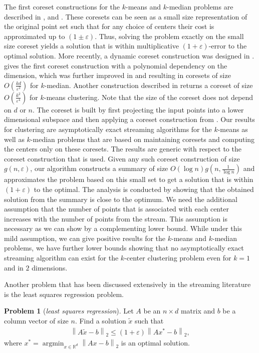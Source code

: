 \documentclass[a4paper,11pt,oneside,english,onecolumn]{article}
\theoremstyle{definition}
\newtheorem{problem}{Problem}
\newcommand{\bigO}[1]{\ensuremath{O\left( #1 \right)}}
\newcommand{\norm}[1]{\ensuremath{\left\| #1\right\|_2}}
\DeclareMathOperator{\argmin}{argmin}
\newcommand{\REAL}{\ensuremath{\mathbb{R}}}
\newcommand{\eps}{\ensuremath{\varepsilon}}
\begin{document}
The first coreset constructions for the $k$-means and $k$-median problems are described in \cite{FirstCoreset}, \cite{HPClustering} and \cite{SmallerCoresets}. These coresets can be seen as a small size representation of the original point set such that for any choice of centers their cost is approximated up to $(1\pm\eps)$. Thus, solving the problem exactly on the small size coreset yields a solution that is within multiplicative $(1+\eps)$-error to the optimal solution. More recently, a dynamic coreset construction was designed in \cite{DynamicCoreset}. \cite{PolyCoreset} gives the first coreset construction with a polynomial dependency on the dimension, which was further improved in \cite{ImproveCoreset1} and \cite{Feldman} resulting in coresets of size $O(\frac{kd}{\eps^2})$ for $k$-median. Another construction described in \cite{TinyData} returns a coreset of size $O(\frac{k ^2}{\eps^4})$ for $k$-means clustering. Note that the size of the coreset does not depend on $d$ or $n$. The coreset is built by first projecting the input points into a lower dimensional subspace and then applying a coreset construction from \cite{Feldman}.
Our results for clustering are asymptotically exact streaming algorithms for the $k$-means as well as $k$-median problems that are based on maintaining coresets and computing the centers only on these coresets. The results are generic with respect to the coreset construction that is used. Given any such coreset construction of size $g(n, \eps )$, our algorithm constructs a summary of size $\bigO{\log n} g(n, \frac 1 {\log n} )$ and approximates the problem based on this small set to get a solution that is within $(1+\eps)$ to the optimal. 
The analysis is conducted by showing that the obtained solution from the summary is close to the optimum. We need the additional assumption that the number of points that is associated with each center increases with the number of points from the stream. This assumption is necessary as we can show by a complementing lower bound. While under this mild assumption, we can give positive results for the $k$-means and $k$-median problems, we have further lower bounds showing that no asymptotically exact streaming algorithm can exist for the $k$-center clustering problem even for $k=1$ and in $2$ dimensions.

Another problem that has been discussed extensively in the streaming literature is the least squares regression problem.
\begin{problem}[\emph{least squares regression}]
Let $A$ be an $n \times d$ matrix and $b$ be a column vector of size $n$. Find a solution $\tilde x$ such that
\begin{align*}
\norm{A\tilde x - b} \leq (1 + \eps) \norm{Ax^* - b},
\end{align*}
where $x^* = \argmin_{x \in \REAL^d} \norm{Ax - b}$ is an optimal solution.
\end{problem}
\end{document}

